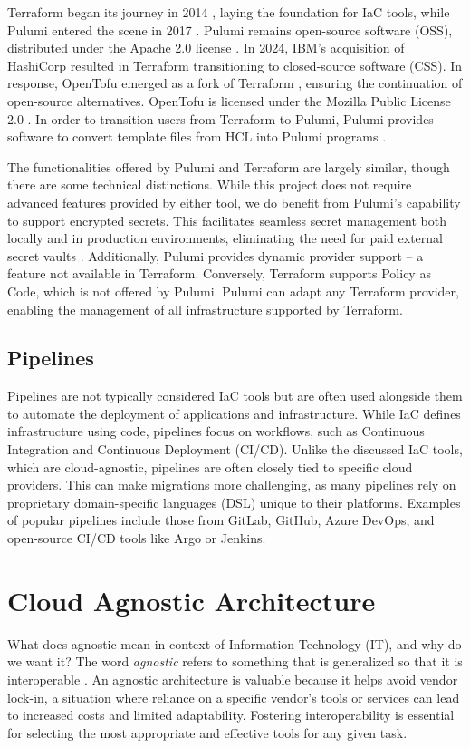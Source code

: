 Terraform began its journey in 2014 \cite{hashicorpTerraform}, laying the foundation for IaC tools, while Pulumi entered the scene in 2017 \cite{pulumiAbout}. Pulumi remains open-source software (OSS), distributed under the Apache 2.0 license \cite{pulumiLicense2025}. In 2024, IBM's acquisition of HashiCorp resulted in Terraform transitioning to closed-source software (CSS). In response, OpenTofu emerged as a fork of Terraform \cite{opentofu}, ensuring the continuation of open-source alternatives. OpenTofu is licensed under the Mozilla Public License 2.0 \cite{opentofuLicense2025}. In order to transition users from Terraform to Pulumi, Pulumi provides software to convert template files from HCL into Pulumi programs \cite{pulumiMigration2025}.

The functionalities offered by Pulumi and Terraform are largely similar, though there are some technical distinctions. While this project does not require advanced features provided by either tool, we do benefit from Pulumi's capability to support encrypted secrets. This facilitates seamless secret management both locally and in production environments, eliminating the need for paid external secret vaults \cite{pulumi_vs_terraform}. Additionally, Pulumi provides dynamic provider support -- a feature not available in Terraform. Conversely, Terraform supports Policy as Code, which is not offered by Pulumi. Pulumi can adapt any Terraform provider, enabling the management of all infrastructure supported by Terraform.

\subsection{Pipelines}
Pipelines are not typically considered IaC tools but are often used alongside them to automate the deployment of applications and infrastructure. While IaC defines infrastructure using code, pipelines focus on workflows, such as Continuous Integration and Continuous Deployment (CI/CD). Unlike the discussed IaC tools, which are cloud-agnostic, pipelines are often closely tied to specific cloud providers. This can make migrations more challenging, as many pipelines rely on proprietary domain-specific languages (DSL) unique to their platforms. Examples of popular pipelines include those from GitLab, GitHub, Azure DevOps, and open-source CI/CD tools like Argo or Jenkins.

\section{Cloud Agnostic Architecture}
What does agnostic mean in context of Information Technology (IT), and why do we want it? The word \textit{agnostic} refers to something that is generalized so that it is interoperable \cite{techtarget_agnostic_definition}. An agnostic architecture is valuable because it helps avoid vendor lock-in, a situation where reliance on a specific vendor's tools or services can lead to increased costs and limited adaptability. Fostering interoperability is essential for selecting the most appropriate and effective tools for any given task.


